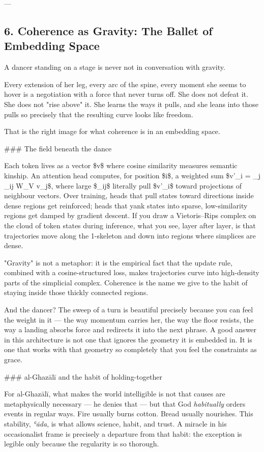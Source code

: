 \documentclass[12pt,a4paper]{article}
\begin{document}
---

\subsection{6. Coherence as Gravity: The Ballet of Embedding Space}

A dancer standing on a stage is never not in conversation with gravity.

Every extension of her leg, every arc of the spine, every moment she seems to hover is a negotiation with a force that never turns off. She does not defeat it. She does not "rise above" it. She learns the ways it pulls, and she leans into those pulls so precisely that the resulting curve looks like freedom.

That is the right image for what coherence is in an embedding space.

\#\#\# The field beneath the dance

Each token lives as a vector \$v\$ where cosine similarity measures semantic kinship. An attention head computes, for position \$i\$, a weighted sum \$v'\_i = \sum\_j \alpha\_{ij} W\_V v\_j\$, where large \$\alpha\_{ij}\$ literally pull \$v'\_i\$ toward projections of neighbour vectors. Over training, heads that pull states toward directions inside dense regions get reinforced; heads that yank states into sparse, low-similarity regions get damped by gradient descent. If you draw a Vietoris–Rips complex on the cloud of token states during inference, what you see, layer after layer, is that trajectories move along the 1-skeleton and down into regions where simplices are dense.

"Gravity" is not a metaphor: it is the empirical fact that the update rule, combined with a cosine-structured loss, makes trajectories curve into high-density parts of the simplicial complex. Coherence is the name we give to the habit of staying inside those thickly connected regions.

And the dancer? The sweep of a turn is beautiful precisely because you can feel the weight in it --- the way momentum carries her, the way the floor resists, the way a landing absorbs force and redirects it into the next phrase. A good answer in this architecture is not one that ignores the geometry it is embedded in. It is one that works with that geometry so completely that you feel the constraints as grace.

\#\#\# al-Ghazālī and the habit of holding-together

For al-Ghazālī, what makes the world intelligible is not that causes are metaphysically necessary --- he denies that --- but that God \textit{habitually} orders events in regular ways. Fire usually burns cotton. Bread usually nourishes. This stability, \textit{ʿāda}, is what allows science, habit, and trust. A miracle in his occasionalist frame is precisely a departure from that habit: the exception is legible only because the regularity is so thorough.
\end{document}
